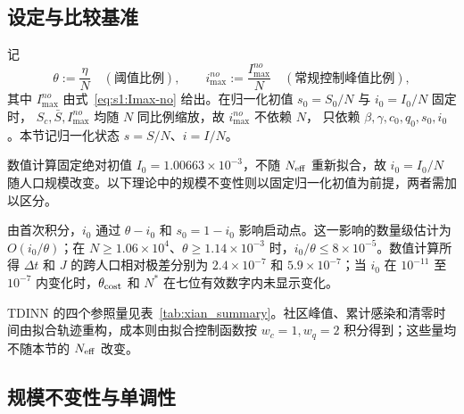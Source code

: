 \documentclass[lang=cn,a4paper,newtx]{elegantpaper}
\numberwithin{equation}{section}
\theoremstyle{plain}
\begin{document}
\subsection{设定与比较基准}
\label{sec:dom:setup}

记
\begin{equation}
  \theta:=\frac{\eta}{N}\quad(\text{阈值比例}),\qquad
  i_{\max}^{no}:=\frac{I_{\max}^{no}}{N}\quad(\text{常规控制峰值比例}),
  \label{eq:dom:ratios}
\end{equation}
其中 $I_{\max}^{no}$ 由式~\eqref{eq:s1:Imax-no} 给出。在归一化初值 $s_0=S_0/N$ 与 $i_0=I_0/N$ 固定时，
$S_c,\bar S,I_{\max}^{no}$ 均随 $N$ 同比例缩放，故 $i_{\max}^{no}$ 不依赖 $N$，
只依赖 $\beta,\gamma,c_0,q_0,s_0,i_0$。本节记归一化状态 $s=S/N$、$i=I/N$。

数值计算固定绝对初值 $I_0=1.00663\times10^{-3}$，不随 $N_{\rm eff}$ 重新拟合，故 $i_0=I_0/N$ 随人口规模改变。以下理论中的规模不变性则以固定归一化初值为前提，两者需加以区分。

由首次积分，$i_0$ 通过 $\theta-i_0$ 和 $s_0=1-i_0$ 影响启动点。这一影响的数量级估计为 $O(i_0/\theta)$；在 $N\ge1.06\times10^4$、$\theta\ge1.14\times10^{-3}$ 时，$i_0/\theta\le8\times10^{-5}$。数值计算所得 $\Delta t$ 和 $J$ 的跨人口相对极差分别为 $2.4\times10^{-7}$ 和 $5.9\times10^{-7}$；当 $i_0$ 在 $10^{-11}$ 至 $10^{-7}$ 内变化时，$\theta_{\rm cost}$ 和 $N^\ast$ 在七位有效数字内未显示变化。

TDINN 的四个参照量见表~\ref{tab:xian_summary}。社区峰值、累计感染和清零时间由拟合轨迹重构，成本则由拟合控制函数按 $w_c=1,w_q=2$ 积分得到；这些量均不随本节的 $N_{\rm eff}$ 改变。



\subsection{规模不变性与单调性}
\label{sec:dom:theory}
\end{document}
